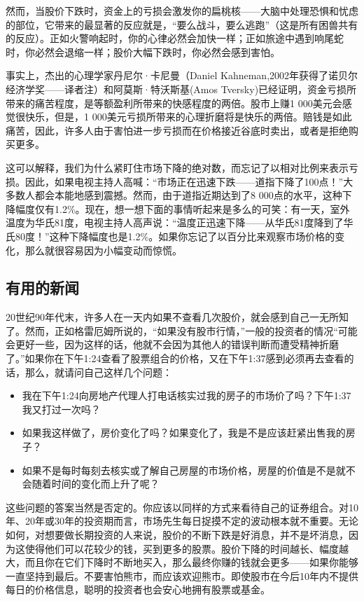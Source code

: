 \documentclass[12pt,oneside]{book}
\begin{document}
然而，当股价下跌时，资金上的亏损会激发你的扁桃核——大脑中处理恐惧和忧虑的部位，它带来的最显著的反应就是，“要么战斗，要么逃跑”（这是所有困兽共有的反应）。正如火警响起时，你的心律必然会加快一样；正如旅途中遇到响尾蛇时，你必然会退缩一样；股价大幅下跌时，你必然会感到害怕。

事实上，杰出的心理学家丹尼尔·卡尼曼（Daniel Kahneman,2002年获得了诺贝尔经济学奖——译者注）和阿莫斯·特沃斯基(Amos Tversky)已经证明，资金亏损所带来的痛苦程度，是等额盈利所带来的快感程度的两倍。股市上赚1 000美元会感觉很快乐，但是，1 000美元亏损所带来的心理折磨将是快乐的两倍。赔钱是如此痛苦，因此，许多人由于害怕进一步亏损而在价格接近谷底时卖出，或者是拒绝购买更多。

这可以解释，我们为什么紧盯住市场下降的绝对数，而忘记了以相对比例来表示亏损。因此，如果电视主持人高喊：“市场正在迅速下跌——道指下降了100点！”大多数人都会本能地感到震撼。然而，由于道指近期达到了8 000点的水平，这种下降幅度仅有1.2\%。现在，想一想下面的事情听起来是多么的可笑：有一天，室外温度为华氏81度，电视主持人高声说：“温度正迅速下降——从华氏81度降到了华氏80度！”这种下降幅度也是1.2\%。如果你忘记了以百分比来观察市场价格的变化，那么就很容易因为小幅变动而惊慌。


\subsection{有用的新闻}
20世纪90年代末，许多人在一天内如果不查看几次股价，就会感到自己一无所知了。然而，正如格雷厄姆所说的，“如果没有股市行情，”一般的投资者的情况“可能会更好一些，因为这样的话，他就不会因为其他人的错误判断而遭受精神折磨了。”如果你在下午1:24查看了股票组合的价格，又在下午1:37感到必须再去查看的话，那么，就请问自己这样几个问题：

\begin{itemize}
\item 我在下午1:24向房地产代理人打电话核实过我的房子的市场价了吗？下午1:37我又打过一次吗？
\item 如果我这样做了，房价变化了吗？如果变化了，我是不是应该赶紧出售我的房子？
\item 如果不是每时每刻去核实或了解自己房屋的市场价格，房屋的价值是不是就不会随着时间的变化而上升了呢？
\end{itemize}

这些问题的答案当然是否定的。你应该以同样的方式来看待自己的证券组合。对10年、20年或30年的投资期而言，市场先生每日捉摸不定的波动根本就不重要。无论如何，对想要做长期投资的人来说，股价的不断下跌是好消息，并不是坏消息，因为这使得他们可以花较少的钱，买到更多的股票。股价下降的时间越长、幅度越大，而且你在它们下降时不断地买入，那么最终你赚的钱就会更多——如果你能够一直坚持到最后。不要害怕熊市，而应该欢迎熊市。即使股市在今后10年内不提供每日的价格信息，聪明的投资者也会安心地拥有股票或基金。
\end{document}
